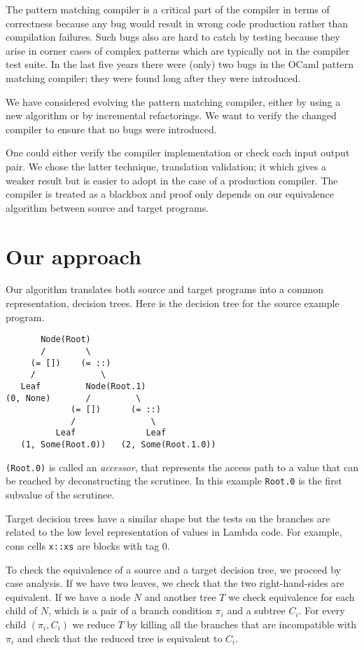 \documentclass[12pt]{article}
\begin{document}
The pattern matching compiler is a critical part of the compiler
in terms of correctness because any bug would result in wrong code
production rather than compilation failures.
Such bugs also are hard to catch by testing because they arise in
corner cases of complex patterns which are typically not in the
compiler test suite.
In the last five years there were (only) two bugs in the OCaml pattern
matching compiler; they were found long after they were introduced.

We have considered evolving the pattern matching compiler, either by
using a new algorithm or by incremental refactorings.
We want to verify the changed compiler to ensure that no bugs were
introduced.

One could either verify the compiler implementation or check each
input output pair. We chose the latter technique, translation
validation; it which gives a weaker result but is easier to adopt in
the case of a production compiler. The compiler is treated as a
blackbox and proof only depends on our equivalence algorithm between
source and target programs.

\section{Our approach}
Our algorithm translates both source and target programs into a common
representation, decision trees. Here is the decision tree for the
source example program.
\begin{verbatim}
       Node(Root)
       /        \
     (= [])    (= ::)
     /             \
   Leaf         Node(Root.1)
(0, None)       /         \
             (= [])      (= ::)
             /               \
          Leaf              Leaf
   (1, Some(Root.0))   (2, Some(Root.1.0))
\end{verbatim}
\texttt{(Root.0)} is called an \emph{accessor}, that represents the
access path to a value that can be reached by deconstructing the
scrutinee. In this example \texttt{Root.0} is the first subvalue of the scrutinee.

Target decision trees have a similar shape but the tests on the
branches are related to the low level representation of values in
Lambda code. For example, cons cells \texttt{x::xs} are blocks with
tag 0.

To check the equivalence of a source and a target decision tree,
we proceed by case analysis.
If we have two leaves, we check that the two right-hand-sides are
equivalent.
If we have a node $N$ and another tree $T$ we check equivalence for
each child of $N$, which is a pair of a branch condition $\pi_i$ and a
subtree $C_i$. For every child $(\pi_i, C_i)$ we reduce $T$ by killing all
the branches that are incompatible with $\pi_i$ and check that the
reduced tree is equivalent to $C_i$.
\end{document}
